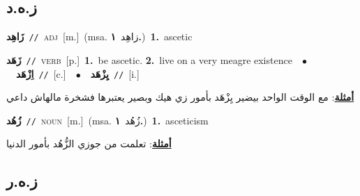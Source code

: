 \documentclass[10pt,a4paper,twoside]{article} %
\begin{document}
\begin{multicols}{2}
\vspace{-3mm}
\subsection*{\color{blue}\foreignlanguage{arabic}{ز.ه.د}\color{blue}{}} 

{\setlength\topsep{0pt}\textbf{\foreignlanguage{arabic}{زَاهِد}}\ {\color{gray}\texttt{//}\color{black}}\ \textsc{adj}\ [m.]\ \color{gray}(msa. \foreignlanguage{arabic}{زاهِد}~\foreignlanguage{arabic}{\textbf{١.}})\color{black}\ \textbf{1.}~ascetic\ } \vspace{2mm}

{\setlength\topsep{0pt}\textbf{\foreignlanguage{arabic}{زَهَد}}\ {\color{gray}\texttt{//}\color{black}}\ \textsc{verb}\ [p.]\ \textbf{1.}~be ascetic.  \textbf{2.}~live on a very meagre existence\ \ $\bullet$\ \ \setlength\topsep{0pt}\textbf{\foreignlanguage{arabic}{اِزْهَد}}\ {\color{gray}\texttt{//}\color{black}}\ [c.]\ \ $\bullet$\ \ \setlength\topsep{0pt}\textbf{\foreignlanguage{arabic}{يِزْهَد}}\ {\color{gray}\texttt{//}\color{black}}\ [i.]\  \begin{flushright}\color{gray}\foreignlanguage{arabic}{\textbf{\underline{\foreignlanguage{arabic}{أمثلة}}}: مع الوقت الواحد بيضير يِزْهَد بأمور زي هيك وبصير يعتبرها فشخرة مالهاش داعي}\end{flushright}\color{black}} \vspace{2mm}

{\setlength\topsep{0pt}\textbf{\foreignlanguage{arabic}{زُهُد}}\ {\color{gray}\texttt{//}\color{black}}\ \textsc{noun}\ [m.]\ \color{gray}(msa. \foreignlanguage{arabic}{زُهُد}~\foreignlanguage{arabic}{\textbf{١.}})\color{black}\ \textbf{1.}~asceticism\  \begin{flushright}\color{gray}\foreignlanguage{arabic}{\textbf{\underline{\foreignlanguage{arabic}{أمثلة}}}: تعلمت من جوزي الزُّهُد بأمور الدنيا}\end{flushright}\color{black}} \vspace{2mm}

\vspace{-3mm}
\subsection*{\color{blue}\foreignlanguage{arabic}{ز.ه.ر}\color{blue}{}} 


\end{multicols}
\end{document}
